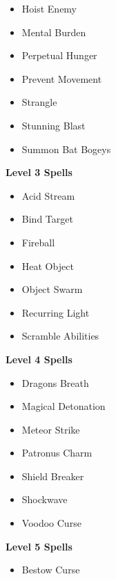 \begin{multicols}{4}
\begin{itemize}[itemsep=0em]
\item Hoist Enemy

\item Mental Burden

\item Perpetual Hunger

\item Prevent Movement

\item Strangle

\item Stunning Blast

\item Summon Bat Bogeys


\end{itemize}
\textbf{Level 3 Spells}
\begin{itemize}[itemsep=0em]
\renewcommand\labelitemi{-}
\item Acid Stream

\item Bind Target

\item Fireball

\item Heat Object

\item Object Swarm

\item Recurring Light

\item Scramble Abilities


\end{itemize}
\textbf{Level 4 Spells}
\begin{itemize}[itemsep=0em]
\renewcommand\labelitemi{-}
\item Dragon{\apos}s Breath

\item Magical Detonation

\item Meteor Strike

\item Patronus Charm

\item Shield Breaker

\item Shockwave

\item Voodoo Curse


\end{itemize}
\textbf{Level 5 Spells}
\begin{itemize}[itemsep=0em]
\renewcommand\labelitemi{-}
\item Bestow Curse


\end{itemize}
\end{multicols}
